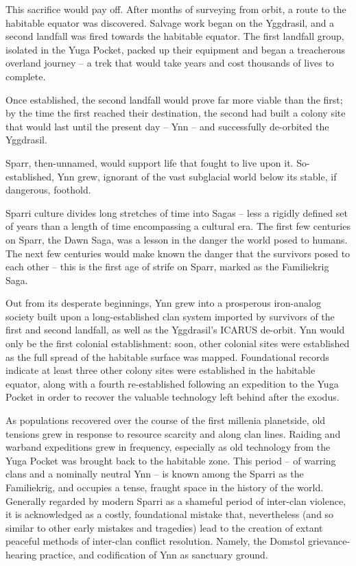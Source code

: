 This sacrifice would pay off. After months of surveying from orbit, a route to the habitable equator
was discovered. Salvage work began on the  Yggdrasil, and a second landfall was fired towards
the habitable equator. The first landfall group, isolated in the Yuga Pocket, packed up their
equipment and began a treacherous overland journey -- a trek that would take years and cost
thousands of lives to complete.

Once established, the second landfall would prove far more viable than the first; by the time the
first reached their destination, the second had built a colony site that would last until the present
day -- Ynn -- and successfully de-orbited the Yggdrasil.




Sparr, then-unnamed, would support life that fought to live upon it. So-established, Ynn grew,
ignorant of the vast subglacial world below its stable, if dangerous, foothold.

Sparri culture divides long stretches of time into Sagas -- less a rigidly defined set of years than a
length of time encompassing a cultural era. The first few centuries on Sparr, the Dawn Saga, was
a lesson in the danger the world posed to humans. The next few centuries would make known the
danger that the survivors posed to each other -- this is the first age of strife on Sparr, marked as
the Familiekrig Saga.

Out from its desperate beginnings, Ynn grew into a prosperous iron-analog society built upon a
long-established clan system imported by survivors of the first and second landfall, as well as the
Yggdrasil’s ICARUS de-orbit. Ynn would only be the first colonial establishment: soon, other
colonial sites were established as the full spread of the habitable surface was mapped.
Foundational records indicate at least three other colony sites were established in the habitable
equator, along with a fourth re-established following an expedition to the Yuga Pocket in order to
recover the valuable technology left behind after the exodus.

As populations recovered over the course of the first millenia planetside, old tensions grew in
response to resource scarcity and along clan lines. Raiding and warband expeditions grew in
frequency, especially as old technology from the Yuga Pocket was brought back to the habitable
zone. This period -- of warring clans and a nominally neutral Ynn -- is known among the Sparri as
the Familiekrig, and occupies a tense, fraught space in the history of the world. Generally
regarded by modern Sparri as a shameful period of inter-clan violence, it is acknowledged as a
costly, foundational mistake that, nevertheless (and so similar to other early mistakes and
tragedies) lead to the creation of extant peaceful methods of inter-clan conflict resolution. Namely,
the Domstol grievance-hearing practice, and codification of Ynn as sanctuary ground.

